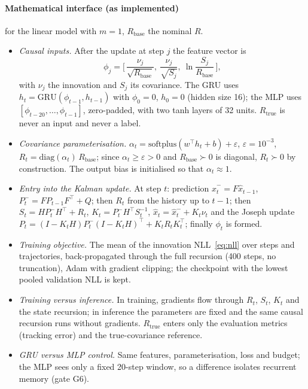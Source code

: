 \documentclass[11pt,a4paper]{article}
\newcommand{\tp}{^{\top}}
\begin{document}
\paragraph{Mathematical interface (as implemented)}\label{sec:interface}
for the linear model with $m=1$, $R_{\mathrm{base}}$ the nominal $R$.
\begin{itemize}
\item \emph{Causal inputs.} After the update at step $j$ the feature vector is
\begin{equation}\label{eq:features}
\phi_j=\Big[\,\frac{\nu_j}{\sqrt{R_{\mathrm{base}}}},\ \frac{\nu_j}{\sqrt{S_j}},\ \ln\frac{S_j}{R_{\mathrm{base}}}\,\Big],
\end{equation}
with $\nu_j$ the innovation and $S_j$ its covariance. The GRU uses $h_t=\mathrm{GRU}(\phi_{t-1},h_{t-1})$
with $\phi_0=0$, $h_0=0$ (hidden size 16); the MLP uses
$[\phi_{t-20},\dots,\phi_{t-1}]$, zero-padded, with two tanh layers of 32 units.
$R_{\mathrm{true}}$ is never an input and never a label.
\item \emph{Covariance parameterisation.} $\alpha_t=\mathrm{softplus}(w\tp h_t+b)+\varepsilon$,
$\varepsilon=10^{-3}$, $R_t=\mathrm{diag}(\alpha_t)\,R_{\mathrm{base}}$; since $\alpha_t\ge\varepsilon>0$
and $R_{\mathrm{base}}\succ0$ is diagonal, $R_t\succ0$ by construction. The output bias is
initialised so that $\alpha_t\approx1$.
\item \emph{Entry into the Kalman update.} At step $t$: prediction
$\hat x^-_t=F\hat x_{t-1}$, $P^-_t=FP_{t-1}F\tp+Q$; then $R_t$ from the history up to $t-1$; then
$S_t=HP^-_tH\tp+R_t$, $K_t=P^-_tH\tp S_t^{-1}$, $\hat x_t=\hat x^-_t+K_t\nu_t$ and the Joseph update
$P_t=(I-K_tH)P^-_t(I-K_tH)\tp+K_tR_tK_t\tp$; finally $\phi_t$ is formed.
\item \emph{Training objective.} The mean of the innovation NLL~\eqref{eq:nll} over steps and
trajectories, back-propagated through the full recursion (400 steps, no truncation), Adam with
gradient clipping; the checkpoint with the lowest pooled validation NLL is kept.
\item \emph{Training versus inference.} In training, gradients flow through $R_t$, $S_t$, $K_t$ and
the state recursion; in inference the parameters are fixed and the same causal recursion runs
without gradients. $R_{\mathrm{true}}$ enters only the evaluation metrics (tracking error) and the
true-covariance reference.
\item \emph{GRU versus MLP control.} Same features, parameterisation, loss and budget; the MLP sees
only a fixed 20-step window, so a difference isolates recurrent memory (gate G6).
\end{itemize}
\end{document}
